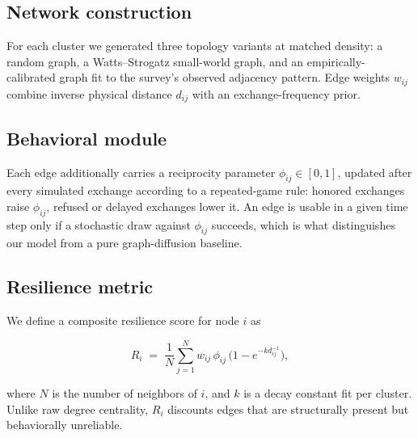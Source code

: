 \documentclass[10pt,twocolumn]{article}
\begin{document}
\subsection{Network construction}
For each cluster we generated three topology variants at matched density:
a random graph, a Watts--Strogatz small-world graph, and an
empirically-calibrated graph fit to the survey's observed adjacency
pattern. Edge weights $w_{ij}$ combine inverse physical distance $d_{ij}$
with an exchange-frequency prior.

\subsection{Behavioral module}
Each edge additionally carries a reciprocity parameter $\phi_{ij} \in
[0,1]$, updated after every simulated exchange according to a
repeated-game rule: honored exchanges raise $\phi_{ij}$, refused or
delayed exchanges lower it. An edge is usable in a given time step only
if a stochastic draw against $\phi_{ij}$ succeeds, which is what
distinguishes our model from a pure graph-diffusion baseline.

\subsection{Resilience metric}
We define a composite resilience score for node $i$ as

\begin{equation}
\label{eq:resilience}
R_i \;=\; \frac{1}{N}\sum_{j=1}^{N} w_{ij}\,\phi_{ij}\,\big(1 - e^{-k d_{ij}^{-1}}\big),
\end{equation}

where $N$ is the number of neighbors of $i$, and $k$ is a decay constant
fit per cluster. Unlike raw degree centrality, $R_i$ discounts edges that
are structurally present but behaviorally unreliable.
\end{document}
